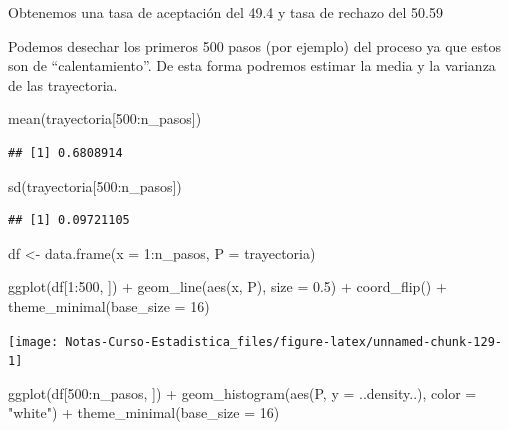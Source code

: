 \documentclass[
  12pt,
]{book}
\newenvironment{Shaded}{\begin{snugshade}}{\end{snugshade}}
\newcommand{\AttributeTok}[1]{\textcolor[rgb]{0.77,0.63,0.00}{#1}}
\newcommand{\DecValTok}[1]{\textcolor[rgb]{0.00,0.00,0.81}{#1}}
\newcommand{\FloatTok}[1]{\textcolor[rgb]{0.00,0.00,0.81}{#1}}
\newcommand{\FunctionTok}[1]{\textcolor[rgb]{0.00,0.00,0.00}{#1}}
\newcommand{\NormalTok}[1]{#1}
\newcommand{\OtherTok}[1]{\textcolor[rgb]{0.56,0.35,0.01}{#1}}
\newcommand{\SpecialCharTok}[1]{\textcolor[rgb]{0.00,0.00,0.00}{#1}}
\newcommand{\StringTok}[1]{\textcolor[rgb]{0.31,0.60,0.02}{#1}}
\theoremstyle{definition}
\theoremstyle{definition}
\theoremstyle{definition}
\theoremstyle{remark}
\begin{document}
Obtenemos una tasa de aceptación del 49.4 y tasa de rechazo del 50.59

Podemos desechar los primeros 500 pasos (por ejemplo) del proceso ya que estos son de ``calentamiento''. De esta forma podremos estimar la media y la varianza de las trayectoria.

\begin{Shaded}
\begin{Highlighting}[]
\FunctionTok{mean}\NormalTok{(trayectoria[}\DecValTok{500}\SpecialCharTok{:}\NormalTok{n\_pasos])}
\end{Highlighting}
\end{Shaded}

\begin{verbatim}
## [1] 0.6808914
\end{verbatim}

\begin{Shaded}
\begin{Highlighting}[]
\FunctionTok{sd}\NormalTok{(trayectoria[}\DecValTok{500}\SpecialCharTok{:}\NormalTok{n\_pasos])}
\end{Highlighting}
\end{Shaded}

\begin{verbatim}
## [1] 0.09721105
\end{verbatim}

\begin{Shaded}
\begin{Highlighting}[]
\NormalTok{df }\OtherTok{\textless{}{-}} \FunctionTok{data.frame}\NormalTok{(}\AttributeTok{x =} \DecValTok{1}\SpecialCharTok{:}\NormalTok{n\_pasos, }\AttributeTok{P =}\NormalTok{ trayectoria)}

\FunctionTok{ggplot}\NormalTok{(df[}\DecValTok{1}\SpecialCharTok{:}\DecValTok{500}\NormalTok{, ]) }\SpecialCharTok{+} \FunctionTok{geom\_line}\NormalTok{(}\FunctionTok{aes}\NormalTok{(x, P), }\AttributeTok{size =} \FloatTok{0.5}\NormalTok{) }\SpecialCharTok{+} 
    \FunctionTok{coord\_flip}\NormalTok{() }\SpecialCharTok{+} \FunctionTok{theme\_minimal}\NormalTok{(}\AttributeTok{base\_size =} \DecValTok{16}\NormalTok{)}
\end{Highlighting}
\end{Shaded}

\begin{center}\texttt{[image: Notas-Curso-Estadistica\_files/figure-latex/unnamed-chunk-129-1]} \end{center}

\begin{Shaded}
\begin{Highlighting}[]
\FunctionTok{ggplot}\NormalTok{(df[}\DecValTok{500}\SpecialCharTok{:}\NormalTok{n\_pasos, ]) }\SpecialCharTok{+} \FunctionTok{geom\_histogram}\NormalTok{(}\FunctionTok{aes}\NormalTok{(P, }\AttributeTok{y =}\NormalTok{ ..density..), }
    \AttributeTok{color =} \StringTok{"white"}\NormalTok{) }\SpecialCharTok{+} \FunctionTok{theme\_minimal}\NormalTok{(}\AttributeTok{base\_size =} \DecValTok{16}\NormalTok{)}
\end{Highlighting}
\end{Shaded}
\end{document}
